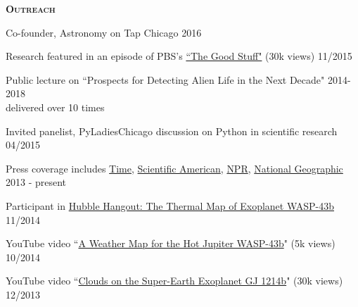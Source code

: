 \documentclass[12pt,letterpaper]{article}
\begin{document}
\textbf{\textsc{Outreach}} 
\begin{compactitem}[]
\item Co-founder, Astronomy on Tap Chicago \hfill 2016
\item Research featured in an episode of PBS's \href{https://www.youtube.com/watch?v=i4Hrmh6LJ0Q&index=2&list=PLsRLUurFnvvXTEbTjA1tvHhWmh6aKTgDw}{``The Good Stuff"} (30k views) \hfill 11/2015
\item Public lecture on ``Prospects for Detecting Alien Life in the Next Decade" \hfill 2014-2018 \\
\hspace*{5 mm}delivered over 10 times
\item Invited panelist, PyLadiesChicago discussion on Python in scientific research \hfill 04/2015
\item Press coverage includes \href{http://science.time.com/2013/12/31/the-real-space-oddities-super-earths-and-jumbo-neptunes/}{Time}, \href{http://www.nature.com/scientificamerican/journal/v23/n3s/full/scientificamericanuniverse0814-4.html}{Scientific American}, \href{http://www.npr.org/2014/01/02/259222620/on-planet-gj1214-b-expect-exotic-cloud-cover}{NPR}, \href{http://news.nationalgeographic.com/news/2014/10/141014-space-hubble-planet-weather-science/?utm_source=Twitter&utm_medium=Social&utm_content=link_tw20141014news-hubbletele&utm_campaign=Content&sf5218387=1}{National Geographic} \hfill 2013 - present
\item Participant in \href{https://www.youtube.com/watch?v=n-oDqYCf3XY}{Hubble Hangout: The Thermal Map of Exoplanet WASP-43b} \hfill 11/2014
\item YouTube video ``\href{https://www.youtube.com/watch?v=tQZqAVhUk9E}{A Weather Map for the Hot Jupiter WASP-43b}" (5k views) \hfill 10/2014
\item YouTube video ``\href{https://www.youtube.com/watch?v=8x2DcgZiKTA}{Clouds on the Super-Earth Exoplanet GJ 1214b}" (30k views) \hfill 12/2013

\end{compactitem}
\end{document}
